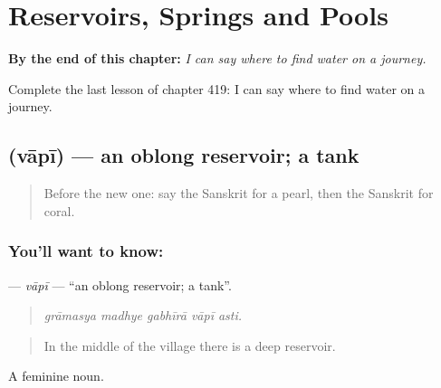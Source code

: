 
\chapter{Reservoirs, Springs and Pools}
\label{ch:sa-reservoirs-springs-and-pools}

\begin{chapteropening}
\textbf{By the end of this chapter:} \emph{I can say where to find water on a journey.}

Complete the last lesson of chapter 419: I can say where to find water on a journey.
\end{chapteropening}

\section[\texorpdfstring{\sk{वापी} (vāpī)}{वापी (vāpī)}]{ (vāpī) — an oblong reservoir; a tank}

\label{lesson:SA-C419-vapi}



\begin{quote}
Before the new one: say the Sanskrit for a pearl, then the Sanskrit for coral.
\end{quote}

\subsection*{You'll want to know: }
\textbf{} — \emph{vāpī} — \textquotedblleft{}an oblong reservoir; a tank\textquotedblright{}.

\begin{quote}
    
\end{quote}

\begin{quote}
\emph{grāmasya madhye gabhīrā vāpī asti.}
\end{quote}

\begin{quote}
In the middle of the village there is a deep reservoir.
\end{quote}

A feminine noun.

